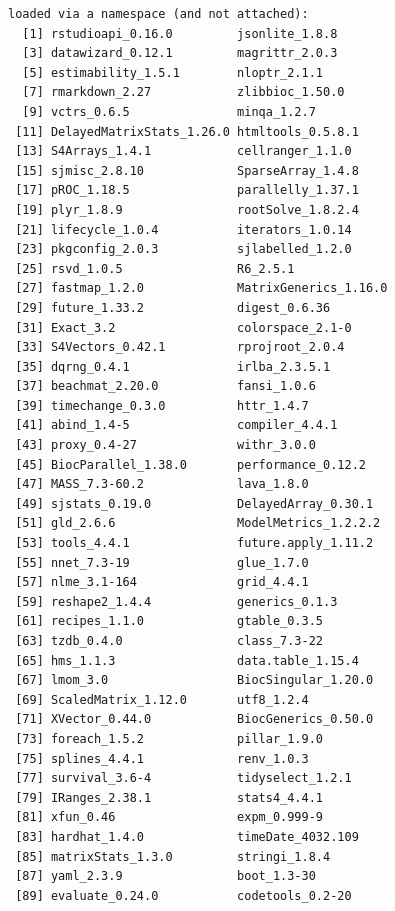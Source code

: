 \documentclass[
  letterpaper,
  DIV=11,
  numbers=noendperiod]{scrreprt}
\begin{document}
\begin{verbatim}
loaded via a namespace (and not attached):
  [1] rstudioapi_0.16.0         jsonlite_1.8.8           
  [3] datawizard_0.12.1         magrittr_2.0.3           
  [5] estimability_1.5.1        nloptr_2.1.1             
  [7] rmarkdown_2.27            zlibbioc_1.50.0          
  [9] vctrs_0.6.5               minqa_1.2.7              
 [11] DelayedMatrixStats_1.26.0 htmltools_0.5.8.1        
 [13] S4Arrays_1.4.1            cellranger_1.1.0         
 [15] sjmisc_2.8.10             SparseArray_1.4.8        
 [17] pROC_1.18.5               parallelly_1.37.1        
 [19] plyr_1.8.9                rootSolve_1.8.2.4        
 [21] lifecycle_1.0.4           iterators_1.0.14         
 [23] pkgconfig_2.0.3           sjlabelled_1.2.0         
 [25] rsvd_1.0.5                R6_2.5.1                 
 [27] fastmap_1.2.0             MatrixGenerics_1.16.0    
 [29] future_1.33.2             digest_0.6.36            
 [31] Exact_3.2                 colorspace_2.1-0         
 [33] S4Vectors_0.42.1          rprojroot_2.0.4          
 [35] dqrng_0.4.1               irlba_2.3.5.1            
 [37] beachmat_2.20.0           fansi_1.0.6              
 [39] timechange_0.3.0          httr_1.4.7               
 [41] abind_1.4-5               compiler_4.4.1           
 [43] proxy_0.4-27              withr_3.0.0              
 [45] BiocParallel_1.38.0       performance_0.12.2       
 [47] MASS_7.3-60.2             lava_1.8.0               
 [49] sjstats_0.19.0            DelayedArray_0.30.1      
 [51] gld_2.6.6                 ModelMetrics_1.2.2.2     
 [53] tools_4.4.1               future.apply_1.11.2      
 [55] nnet_7.3-19               glue_1.7.0               
 [57] nlme_3.1-164              grid_4.4.1               
 [59] reshape2_1.4.4            generics_0.1.3           
 [61] recipes_1.1.0             gtable_0.3.5             
 [63] tzdb_0.4.0                class_7.3-22             
 [65] hms_1.1.3                 data.table_1.15.4        
 [67] lmom_3.0                  BiocSingular_1.20.0      
 [69] ScaledMatrix_1.12.0       utf8_1.2.4               
 [71] XVector_0.44.0            BiocGenerics_0.50.0      
 [73] foreach_1.5.2             pillar_1.9.0             
 [75] splines_4.4.1             renv_1.0.3               
 [77] survival_3.6-4            tidyselect_1.2.1         
 [79] IRanges_2.38.1            stats4_4.4.1             
 [81] xfun_0.46                 expm_0.999-9             
 [83] hardhat_1.4.0             timeDate_4032.109        
 [85] matrixStats_1.3.0         stringi_1.8.4            
 [87] yaml_2.3.9                boot_1.3-30              
 [89] evaluate_0.24.0           codetools_0.2-20         

\end{verbatim}
\end{document}
